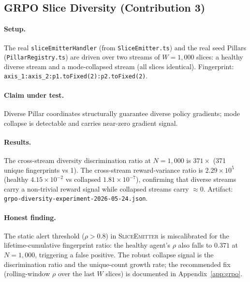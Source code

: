 \subsection{GRPO Slice Diversity (Contribution 3)}
\label{sec:eval-grpo-diversity}

\paragraph{Setup.}
The real \texttt{sliceEmitterHandler} (from \texttt{SliceEmitter.ts}) and the
real seed Pillars (\texttt{PillarRegistry.ts}) are driven over two streams of
$W = 1{,}000$ slices: a healthy diverse stream and a mode-collapsed stream (all
slices identical).  Fingerprint: \texttt{axis\_1:axis\_2:p1.toFixed(2):p2.toFixed(2)}.

\paragraph{Claim under test.}
Diverse Pillar coordinates structurally guarantee diverse policy gradients;
mode collapse is detectable and carries near-zero gradient signal.

\paragraph{Results.}
The cross-stream diversity discrimination ratio at $N = 1{,}000$ is
$371\times$ (371 unique fingerprints vs 1).  The cross-stream reward-variance
ratio is $2.29 \times 10^{5}$ (healthy $4.15 \times 10^{-2}$
vs collapsed $1.81 \times 10^{-7}$), confirming that diverse streams carry a
non-trivial reward signal while collapsed streams carry $\approx 0$.
Artifact: \texttt{grpo-diversity-experiment-2026-05-24.json}.

\paragraph{Honest finding.}
The static alert threshold ($\rho > 0.8$) in \textsc{SliceEmitter} is
miscalibrated for the lifetime-cumulative fingerprint ratio: the healthy
agent's $\rho$ also falls to $0.371$ at $N = 1{,}000$, triggering a false
positive.  The robust collapse signal is the discrimination ratio and the
unique-count growth rate; the recommended fix (rolling-window $\rho$ over
the last $W$ slices) is documented in Appendix~\ref{app:grpo}.


